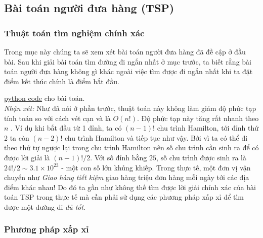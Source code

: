
\subsection{Bài toán người đưa hàng (TSP)}
\subsubsection{Thuật toán tìm nghiệm chính xác}
Trong mục này chúng ta sẽ xem xét bài toán người đưa hàng đã đề cập ở đầu bài.
Sau khi giải bài toán tìm đường đi ngắn nhất ở mục trước, ta biết rằng bài toán
người đưa hàng không gì khác ngoài việc tìm được đi ngắn nhất khi ta đặt điểm
kết thúc chính là điểm bắt đầu. 

\href{https://github.com/batman0911/dma_homework/blob/master/hw_02/src/travelling_salesman.ipynb}{python code} 
    cho bài toán. \\

\textit{Nhận xét: } Như đã nói ở phần trước, thuật toán này không làm giảm độ phức 
tạp tính toán so với cách vét cạn và là $O (n!)$.
Độ phức tạp này tăng rất nhanh theo $n$ . Ví dụ khi bắt đầu từ 1 đỉnh, ta có $(n-1)!$
chu trình Hamilton, tới đỉnh thứ 2 ta còn $(n-2)!$ chu trình Hamilton và tiếp tục như vậy.
Bởi vì ta có thể đi theo thứ tự ngược lại trong chu trình Hamilton nên số chu trình cần
sinh ra để có được lời giải là $(n-1)!/2$. Với số đỉnh bằng $25$, số chu trình được sinh 
ra là $24!/2 \sim 3.1 \times 10^{23}$ - một con số lớn khủng khiếp. Trong thực tế, 
một đơn vị vận chuyển như \textit{Giao hàng tiết kiệm} giao hàng triệu đơn hàng mỗi ngày 
tới các địa điểm khác nhau! Do đó ta gần như không thế tìm được lời giải chính xác của bài 
toán TSP trong thực tế mà cần phải sử dụng các phương pháp xấp xỉ để tìm được một 
đường đi \textit{đủ tốt}.

\subsubsection{Phương pháp xấp xỉ}

